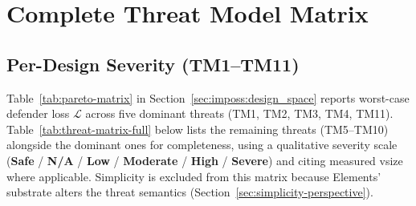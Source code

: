 %

\section{Complete Threat Model Matrix}
\label{app:threat_matrix}
\label{app:threat-matrix}

\subsection{Per-Design Severity (TM1--TM11)}
\label{app:threat_matrix:severity}

Table~\ref{tab:pareto-matrix} in Section~\ref{sec:imposs:design_space}
reports worst-case defender loss $\mathcal{L}$ across five dominant
threats (TM1, TM2, TM3, TM4, TM11). Table~\ref{tab:threat-matrix-full}
below lists the remaining threats (TM5--TM10) alongside the dominant
ones for completeness, using a qualitative severity scale
(\textbf{Safe} / \textbf{N/A} / \textbf{Low} / \textbf{Moderate} /
\textbf{High} / \textbf{Severe}) and citing measured vsize where
applicable. Simplicity is excluded from this matrix because
Elements' substrate alters the threat semantics
(Section~\ref{sec:simplicity-perspective}).


